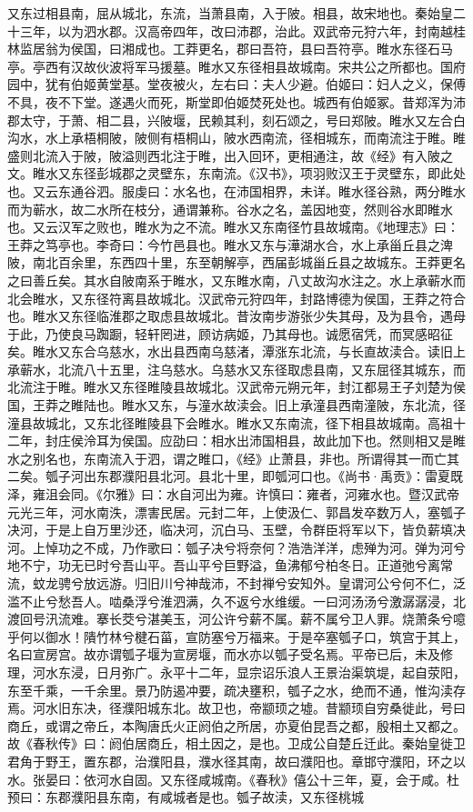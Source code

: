 \documentclass[12pt,UTF8]{ctexbook}
\begin{document}
又东过相县南，屈从城北，东流，当萧县南，入于陂。相县，故宋地也。秦始皇二十三年，以为泗水郡。汉高帝四年，改曰沛郡，治此。双武帝元狩六年，封南越桂林监居翁为侯国，曰湘成也。工莽更名，郡曰吾符，县曰吾符亭。睢水东径石马亭。亭西有汉故伙波将军马援墓。睢水又东径相县故城南。宋共公之所都也。国府园中，犹有伯姬黄堂基。堂夜被火，左右曰：夫人少避。伯姬曰：妇人之义，保傅不具，夜不下堂。遂遇火而死，斯堂即伯姬焚死处也。城西有伯姬冢。昔郑浑为沛郡太守，于萧、相二县，兴陂堰，民赖其利，刻石颂之，号曰郑陂。睢水又左合白沟水，水上承梧桐陂，陂侧有梧桐山，陂水西南流，径相城东，而南流注于睢。睢盛则北流入于陂，陂溢则西北注于睢，出入回环，更相通注，故《经》有入陂之文。睢水又东径彭城郡之灵壁东，东南流。《汉书》，项羽败汉王于灵壁东，即此处也。又云东通谷泗。服虔曰：水名也，在沛国相界，未详。睢水径谷熟，两分睢水而为蕲水，故二水所在枝分，通谓兼称。谷水之名，盖因地变，然则谷水即睢水也。又云汉军之败也，睢水为之不流。睢水又东南径竹县故城南。《地理志》曰：王莽之笃亭也。李奇曰：今竹邑县也。睢水又东与澕湖水合，水上承甾丘县之渒陂，南北百余里，东西四十里，东至朝解亭，西届彭城甾丘县之故城东。王莽更名之曰善丘矣。其水自陂南系于睢水，又东睢水南，八丈故沟水注之。水上承蕲水而北会睢水，又东径符离县故城北。汉武帝元狩四年，封路博德为侯国，王莽之符合也。睢水又东径临淮郡之取虑县故城北。昔汝南步游张少失其母，及为县令，遇母于此，乃使良马踟蹰，轻轩罔进，顾访病姬，乃其母也。诚愿宿凭，而冥感昭征矣。睢水又东合乌慈水，水出县西南乌慈渚，潭涨东北流，与长直故渎合。读旧上承蕲水，北流八十五里，注乌慈水。乌慈水又东径取虑县南，又东屈径其城东，而北流注于睢。睢水又东径睢陵县故城北。汉武帝元朔元年，封江都易王子刘楚为侯国，王莽之睢陆也。睢水又东，与潼水故渎会。旧上承潼县西南潼陂，东北流，径潼县故城北，又东北径睢陵县下会睢水。睢水又东南流，径下相县故城南。高祖十二年，封庄侯泠耳为侯国。应劭曰：相水出沛国相县，故此加下也。然则相又是睢水之别名也，东南流入于泗，谓之睢口，《经》止萧县，非也。所谓得其一而亡其二矣。瓠子河出东郡濮阳县北河。县北十里，即瓠河口也。《尚书·禹贡》：雷夏既泽，雍沮会同。《尔雅》曰：水自河出为雍。许慎曰：雍者，河雍水也。暨汉武帝元光三年，河水南泆，漂害民居。元封二年，上使汲仁、郭昌发卒数万人，塞瓠子决河，于是上自万里沙还，临决河，沉白马、玉壁，令群臣将军以下，皆负薪填决河。上悼功之不成，乃作歌曰：瓠子决兮将奈何？浩浩洋洋，虑殚为河。弹为河兮地不宁，功无已时兮吾山平。吾山平兮巨野溢，鱼沸郁兮柏冬日。正道弛兮离常流，蚊龙骋兮放远游。归旧川兮神哉沛，不封禅兮安知外。皇谓河公兮何不仁，泛滥不止兮愁吾人。啮桑浮兮淮泗满，久不返兮水维缓。一曰河汤汤兮激潺潺浸，北渡回号汛流难。搴长茭兮湛美玉，河公许兮薪不属。薪不属兮卫人罪。烧萧条兮噫乎何以御水！隤竹林兮楗石菑，宣防塞兮万福来。于是卒塞瓠子口，筑宫于其上，名曰宣房宫。故亦谓瓠子堰为宣房堰，而水亦以瓠子受名焉。平帝已后，未及修理，河水东浸，日月弥广。永平十二年，显宗诏乐浪人王景治渠筑堤，起自荥阳，东至千乘，一千余里。景乃防遏冲要，疏决壅积，瓠子之水，绝而不通，惟沟渎存焉。河水旧东决，径濮阳城东北。故卫也，帝颛顼之墟。昔颛顼自穷桑徙此，号曰商丘，或谓之帝丘，本陶唐氏火正阏伯之所居，亦夏伯昆吾之都，殷相土又都之。故《春秋传》曰：阏伯居商丘，相土因之，是也。卫成公自楚丘迁此。秦始皇徙卫君角于野王，置东郡，治濮阳县，濮水径其南，故曰濮阳也。章邯守濮阳，环之以水。张晏曰：依河水自固。又东径咸城南。《春秋》僖公十三年，夏，会于咸。杜预曰：东郡濮阳县东南，有咸城者是也。瓠子故渎，又东径桃城
\end{document}
